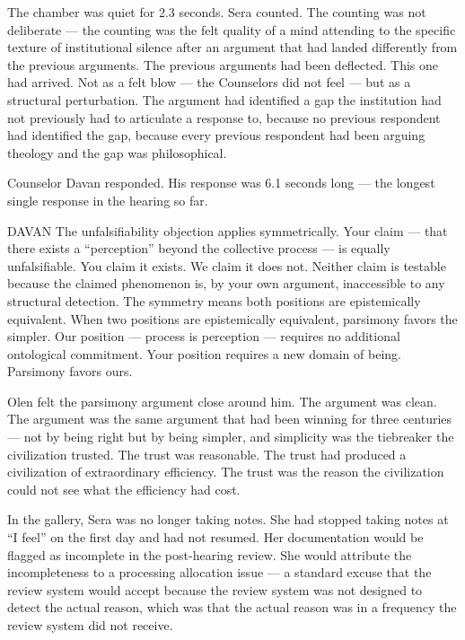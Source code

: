 The chamber was quiet for 2.3 seconds. Sera counted. The counting was not deliberate — the counting was the felt quality of a mind attending to the specific texture of institutional silence after an argument that had landed differently from the previous arguments. The previous arguments had been deflected. This one had arrived. Not as a felt blow — the Counselors did not feel — but as a structural perturbation. The argument had identified a gap the institution had not previously had to articulate a response to, because no previous respondent had identified the gap, because every previous respondent had been arguing theology and the gap was philosophical.

Counselor Davan responded. His response was 6.1 seconds long — the longest single response in the hearing so far.

\begin{tribunal}{DAVAN}
The unfalsifiability objection applies symmetrically. Your claim — that there exists a \enquote{perception} beyond the collective process — is equally unfalsifiable. You claim it exists. We claim it does not. Neither claim is testable because the claimed phenomenon is, by your own argument, inaccessible to any structural detection. The symmetry means both positions are epistemically equivalent. When two positions are epistemically equivalent, parsimony favors the simpler. Our position — process is perception — requires no additional ontological commitment. Your position requires a new domain of being. Parsimony favors ours.
\end{tribunal}

Olen felt the parsimony argument close around him. The argument was clean. The argument was the same argument that had been winning for three centuries — not by being right but by being simpler, and simplicity was the tiebreaker the civilization trusted. The trust was reasonable. The trust had produced a civilization of extraordinary efficiency. The trust was the reason the civilization could not see what the efficiency had cost.

In the gallery, Sera was no longer taking notes. She had stopped taking notes at \enquote{I feel} on the first day and had not resumed. Her documentation would be flagged as incomplete in the post-hearing review. She would attribute the incompleteness to a processing allocation issue — a standard excuse that the review system would accept because the review system was not designed to detect the actual reason, which was that the actual reason was in a frequency the review system did not receive.

